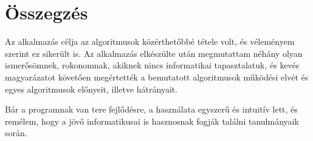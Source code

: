 \chapter{Összegzés}
\label{ch:sum}

Az alkalmazás célja az algoritmusok közérthetőbbé tétele volt, és véleményem szerint ez sikerült is. Az alkalmazás elkészülte után megmutattam néhány olyan ismerősömnek, rokonomnak, akiknek nincs informatikai tapasztalatuk, és kevés magyarázatot követően megértették a bemutatott algoritmusok működési elvét és egyes algoritmusok előnyeit, illetve hátrányait.

Bár a programnak van tere fejlődésre, a használata egyszerű és intuitív lett, és remélem, hogy a jövő informatikusai is hasznosnak fogják találni tanulmányaik során.
